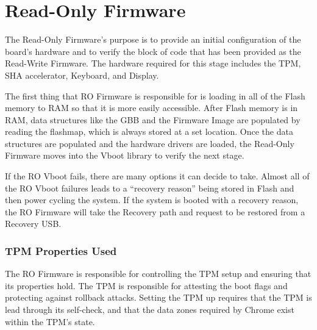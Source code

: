 \section{Read-Only Firmware}

The Read-Only Firmware's purpose is to provide an initial configuration of the board's hardware and to verify the block of code that has been provided as the Read-Write Firmware.
The hardware required for this stage includes the TPM, SHA accelerator, Keyboard, and Display.


The first thing that RO Firmware is responsible for is loading in all of the Flash memory to RAM so that it is more easily accessible. 
After Flash memory is in RAM, data structures like the GBB and the Firmware Image are populated by reading the flashmap, which is always stored at a set location.
Once the data structures are populated and the hardware drivers are loaded, the Read-Only Firmware moves into the Vboot library to verify the next stage.


If the RO Vboot fails, there are many options it can decide to take.
Almost all of the RO Vboot failures leads to a ``recovery reason'' being stored in Flash and then power cycling the system.
If the system is booted with a recovery reason, the RO Firmware will take the Recovery path and request to be restored from a Recovery USB. %

\subsubsection{TPM Properties Used}

The RO Firmware is responsible for controlling the TPM setup and ensuring that its properties hold. 
The TPM is responsible for attesting the boot flags and protecting against rollback attacks. 
Setting the TPM up requires that the TPM is lead through its self-check, and that the data zones required by Chrome exist within the TPM's state.

